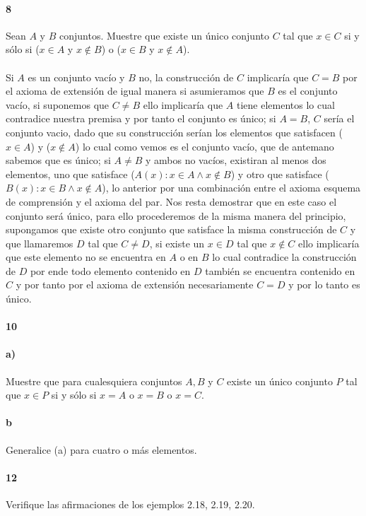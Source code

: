 \documentclass{article}
\begin{document}
\paragraph{8} Sean $A$ y $B$ conjuntos. Muestre que existe un único conjunto $C$ tal que $x \in C$ si y sólo si ($x \in A$ y $x \notin B $) o ($x \in B$ y $x \notin A $).
\paragraph{} Si $A$ es un conjunto vacío y $B$ no, la construcción de $C$ implicaría que $C=B$ por el axioma de extensión de igual manera si asumieramos que $B$ es el conjunto vacío, si suponemos que $C \neq B$ ello implicaría que $A$ tiene elementos lo cual contradice nuestra premisa y por tanto el conjunto es único; si $A=B$, $C$ sería el conjunto vacio, dado que su construcción serían los elementos que satisfacen ($x \in A$) y ($x \notin A$) lo cual como vemos es el conjunto vacío, que de antemano sabemos que es único; si $A \neq B$ y ambos no vacíos, existiran al menos dos elementos, uno que satisface ($A(x): x \in A \land x \notin B$) y otro que satisface ($B(x): x \in B \land x \notin A$), lo anterior por una combinación entre el axioma esquema de comprensión y el axioma del par. Nos resta demostrar que en este caso el conjunto será único, para ello procederemos de la misma manera del principio, supongamos que existe otro conjunto que satisface la misma construcción de $C$ y que llamaremos $D$ tal que $C \neq D$, si existe un $x \in D$ tal que $x \notin C$ ello implicaría que este elemento no se encuentra en $A$ o en $B$ lo cual contradice la construcción de $D$ por ende todo elemento contenido en $D$ también se encuentra contenido en $C$ y por tanto por el axioma de extensión necesariamente $C=D$ y por lo tanto es único.
\paragraph{10}
\paragraph{a)} Muestre que para cualesquiera conjuntos $A, B$ y $C$ existe un único conjunto $P$ tal que $x \in P$ si y sólo si  $x = A$ o $x = B$ o $x = C$.
\paragraph{b} Generalice (a) para cuatro o más elementos.
\paragraph{12} Verifique las  afirmaciones de los ejemplos 2.18, 2.19, 2.20.
\end{document}

